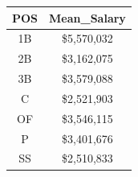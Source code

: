 \documentclass[]{book}
\theoremstyle{definition}
\theoremstyle{definition}
\theoremstyle{definition}
\theoremstyle{remark}
\begin{document}
\begin{longtable}[]{@{}cc@{}}
\toprule
\begin{minipage}[b]{0.08\columnwidth}\centering
POS\strut
\end{minipage} & \begin{minipage}[b]{0.18\columnwidth}\centering
Mean\_Salary\strut
\end{minipage}\tabularnewline
\midrule
\endhead
\begin{minipage}[t]{0.08\columnwidth}\centering
1B\strut
\end{minipage} & \begin{minipage}[t]{0.18\columnwidth}\centering
\$5,570,032\strut
\end{minipage}\tabularnewline
\begin{minipage}[t]{0.08\columnwidth}\centering
2B\strut
\end{minipage} & \begin{minipage}[t]{0.18\columnwidth}\centering
\$3,162,075\strut
\end{minipage}\tabularnewline
\begin{minipage}[t]{0.08\columnwidth}\centering
3B\strut
\end{minipage} & \begin{minipage}[t]{0.18\columnwidth}\centering
\$3,579,088\strut
\end{minipage}\tabularnewline
\begin{minipage}[t]{0.08\columnwidth}\centering
C\strut
\end{minipage} & \begin{minipage}[t]{0.18\columnwidth}\centering
\$2,521,903\strut
\end{minipage}\tabularnewline
\begin{minipage}[t]{0.08\columnwidth}\centering
OF\strut
\end{minipage} & \begin{minipage}[t]{0.18\columnwidth}\centering
\$3,546,115\strut
\end{minipage}\tabularnewline
\begin{minipage}[t]{0.08\columnwidth}\centering
P\strut
\end{minipage} & \begin{minipage}[t]{0.18\columnwidth}\centering
\$3,401,676\strut
\end{minipage}\tabularnewline
\begin{minipage}[t]{0.08\columnwidth}\centering
SS\strut
\end{minipage} & \begin{minipage}[t]{0.18\columnwidth}\centering
\$2,510,833\strut
\end{minipage}\tabularnewline
\bottomrule
\end{longtable}
\end{document}
